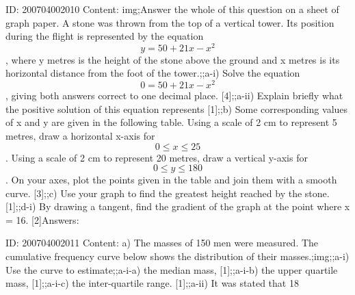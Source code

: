 \documentclass{article}
\begin{document}
ID: 200704002010
Content:
img;Answer the whole of this question on a sheet of graph paper. A stone was thrown from the top of a vertical tower. Its position during the flight is represented by the equation $$y=50+21 x-x^{2}$$, where y metres is the height of the stone above the ground and x metres is its horizontal distance from the foot of the tower.;;a-i) Solve the equation $$0=50+21x-x^{2}$$, giving both answers correct to one decimal place. [4];;a-ii) Explain briefly what the positive solution of this equation represents [1];;b) Some corresponding values of x and y are given in the following table. Using a scale of 2 cm to represent 5 metres, draw a horizontal x-axis for $$0\leq x\leq 25$$. Using a scale of 2 cm to represent 20 metres, draw a vertical y-axis for $$0\leq y\leq 180$$. On your axes, plot the points given in the table and join them with a smooth curve. [3];;c) Use your graph to find the greatest height reached by the stone. [1];;d-i) By drawing a tangent, find the gradient of the graph at the point where x = 16. [2]Answers:

ID: 200704002011
Content:
a) The masses of 150 men were measured. The cumulative frequency curve below shows the distribution of their masses.;img;;a-i) Use the curve to estimate;;a-i-a) the median mass, [1];;a-i-b) the upper quartile mass, [1];;a-i-c) the inter-quartile range. [1];;a-ii) It was stated that 18%
\end{document}
